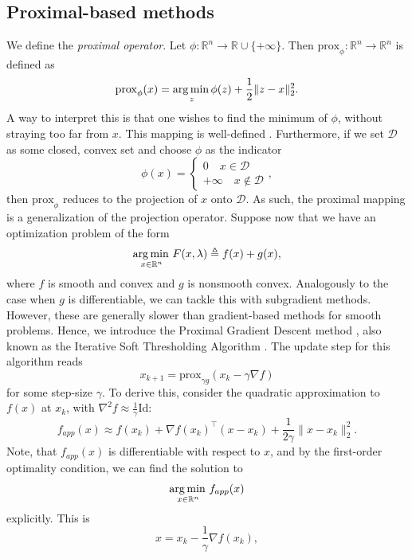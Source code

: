 \documentclass[11pt, twoside]{report}
\begin{document}
\subsection{Proximal-based methods}
We define the \textit{proximal operator}. Let $\phi : \mathbb{R}^n \xrightarrow[]{} \mathbb{R} \cup \{+
\infty\}$. Then $\mathrm{prox}_\phi: \mathbb{R}^n \xrightarrow[]{} \mathbb{R}^n$ is defined as
\begin{equation} \label{proximal}
    \mathrm{prox}_{\phi}(x) =\underset{z} {\operatorname*{arg\, min \,}} \phi(z) + \frac{1}{2}\|z-x\|_2^2.
\end{equation}
A way to interpret this is that one wishes to find the minimum of $\phi$, without straying too far from $x$\cite{proxalgs}. This mapping is well-defined \cite{fawzi2022lectures}. Furthermore, if we set $\mathcal{D}$ as some closed, convex set and choose $\phi$ as the indicator
\[\phi(x) = \begin{cases}
  0 \quad x \in \mathcal{D} \\
  +\infty \quad x \notin \mathcal{D}
\end{cases},\]
then $\mathrm{prox}_\phi$ reduces to the projection of $x$ onto $\mathcal{D}$. As such, the proximal mapping is a generalization of the projection operator. Suppose now that we have an optimization problem of the form
\begin{equation}
    \operatorname*{arg\, min \,}_{x \in \mathbb{R}^n} {F(x, \lambda) \triangleq f(x) + g(x)},
\end{equation}
where $f$ is smooth and convex and $g$ is nonsmooth convex. Analogously to the case when $g$ is differentiable, we can tackle this with subgradient methods. However, these are generally slower than gradient-based methods for smooth problems. Hence, we introduce the Proximal Gradient Descent method , also known as the Iterative Soft Thresholding Algorithm \cite{daubechies2004iterative}. The update step for this algorithm reads
\begin{equation} \label{ISTA_step}
    x_{k+1} = \mathrm{prox}_{\gamma g}(x_k - \gamma \nabla f)
\end{equation}
for some step-size $\gamma$. To derive this, consider the quadratic approximation to $f(x)$ at $x_k$, with $\nabla^2 f \approx \frac{1}{\gamma}\mathrm{Id}$:
\[f_{app}(x) \approx f(x_k) + \nabla f(x_k)^\top (x-x_k) + \frac{1}{2\gamma} \|x-x_k\|_2^2.\]
Note, that $f_{app}(x)$ is differentiable with respect to $x$, and by the first-order optimality condition, we can find the solution to 
\[\operatorname*{arg\, min \,}_{x \in \mathbb{R}^n} f_{app}(x)\]
explicitly. This is
\[x = x_k - \frac{1}{\gamma} \nabla f(x_k),\]
\end{document}
